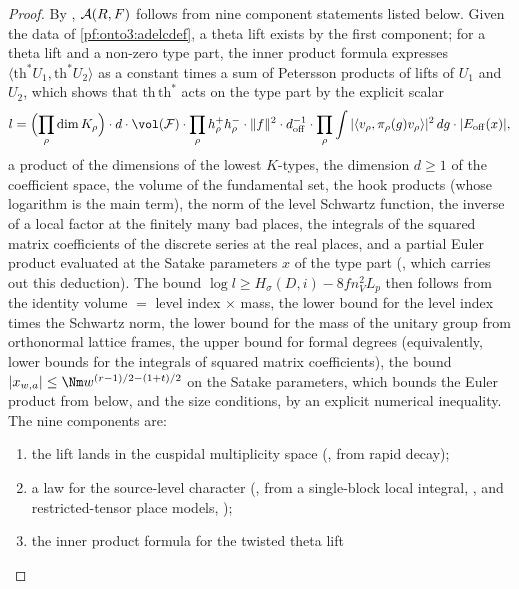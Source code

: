 \begin{proof}
By , $\mathcal{A}(R,F)$ follows from nine
component statements listed below. Given the data of \cref{pf:onto3:adelcdef}, a theta lift exists by the first
component; for a theta lift and a non-zero type part, the inner product formula expresses
$\langle\mathrm{th}^*U_1,\mathrm{th}^*U_2\rangle$ as a constant times a sum of Petersson products of lifts of $U_1$
and $U_2$, which shows that $\mathrm{th}\,\mathrm{th}^*$ acts on the type part by the explicit scalar
\[
l=\Bigl(\prod_\rho\dim K_\rho\Bigr)\cdot d\cdot\vol(\mathcal F)\cdot\prod_\rho h_\rho^+h_\rho^-\cdot\|f\|^2\cdot
d_{\mathrm{off}}^{-1}\cdot\prod_\rho\int|\langle v_\rho,\pi_\rho(g)v_\rho\rangle|^2\,dg\cdot|E_{\mathrm{off}}(x)|,
\]
a product of the dimensions of the lowest $K$-types, the dimension $d\ge1$ of the coefficient space, the volume of
the fundamental set, the hook products (whose logarithm is the main term), the norm of the level Schwartz function,
the inverse of a local factor at the finitely many bad places, the integrals of the squared matrix coefficients of
the discrete series at the real places, and a partial Euler product evaluated at the Satake parameters $x$ of the
type part (, which carries out this deduction). The bound
$\log l\ge H_\sigma(D,i)-8fn_V^2L_p$ then follows from the identity volume $=$ level index $\times$ mass, the lower
bound for the level index times the Schwartz norm, the lower bound for the mass of the unitary group from
orthonormal lattice frames, the upper bound for formal degrees (equivalently, lower bounds for the integrals of
squared matrix coefficients), the bound $|x_{w,a}|\le\Nm w^{(r-1)/2-(1+t)/2}$ on the Satake parameters, which bounds
the Euler product from below, and the size conditions, by an explicit numerical inequality. The nine components are:
\begin{enumerate}[label=(\arabic*)]
\item the lift lands in the cuspidal multiplicity space
(, from rapid decay);
\item a law for the source-level character (, from a
single-block local integral, , and restricted-tensor place
models, );
\item the inner product formula for the twisted theta lift

\end{enumerate}
\end{proof}
